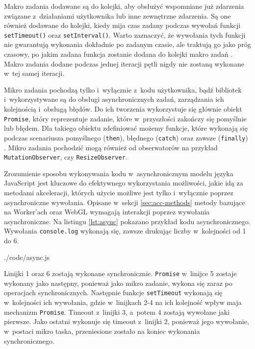 Makro zadania dodawane są do kolejki, aby obsłużyć wspomniane już zdarzenia związane z~działaniami użytkownika lub inne zewnętrzne zdarzenia. Są one również dodawane do kolejki, kiedy mija czas zadany podczas wywołań funkcji \lstinline{setTimeout()} oraz \lstinline{setInterval()}. Warto zaznaczyć, że wywołania tych funkcji nie gwarantują wykonania dokładnie po zadanym czasie, ale traktują go jako próg czasowy, po jakim zadana funkcja zostanie dodana do kolejki makro zadań \cite{setTimeout}. Makro zadania dodane podczas jednej iteracji pętli nigdy nie zostaną wykonane w~tej samej iteracji.

Mikro zadania pochodzą tylko i~wyłącznie z~kodu użytkownika, bądź bibliotek i~wykorzystywane są do obsługi asynchronicznych zadań, zarządzania ich kolejnością i~obsługą błędów\cite{runtime}. Do ich tworzenia wykorzystuje się głównie obiekt \lstinline{Promise}, który reprezentuje zadanie, które w~przyszłości zakończy się pomyślnie lub błędem. Dla takiego obiektu zdefiniować możemy funkcje, które wykonają się podczas scenariusza pomyślnego (\lstinline{then}), błędnego (\lstinline{catch}) oraz zawsze (\lstinline{finally}) \cite{promise}. Mikro zadania pochodzić mogą również od obserwatorów na przykład \lstinline{MutationObserver}, czy \lstinline{ResizeObserver}.

Zrozumienie sposobu wykonywania kodu w~asynchronicznym modelu języka JavaScript jest kluczowe do efektywnego wykorzystania możliwości, jakie idą za metodami akceleracji, których użycie możliwe jest tylko i~wyłącznie poprzez asynchroniczne wywołania. Opisane w~sekcji \ref{sec:acc-methods} metody bazujące na Worker'ach oraz WebGL wymagają interakcji poprzez wywołania asynchroniczne. Na listingu \ref{lst:async} pokazano przykład kodu asynchronicznego. Wywołania \mbox{\lstinline{console.log}} wykonają się, zawsze drukując liczby w~kolejności od 1 do 6.

 {./code/async.js}

Linijki 1 oraz 6 zostają wykonane synchronicznie. \lstinline{Promise} w~linijce 5 zostaje wykonany jako następny, ponieważ jako mikro zadanie, wykona się zaraz po operacjach synchronicznych. Następnie funkcje \lstinline{setTimeout} wykonają się w~kolejności ich wywołania, gdzie w~linijkach 2-4 na ich kolejność wpływ maja mechanizm \lstinline{Promise}. Timeout z~linijki 3, a~potem 4 zostają wywołane jaki pierwsze. Jako ostatni wykonuje się timeout z~linijki 2, ponieważ jego wywołanie, w~postaci mikro taska, przeniesione zostało na koniec wykonania synchronicznego.

